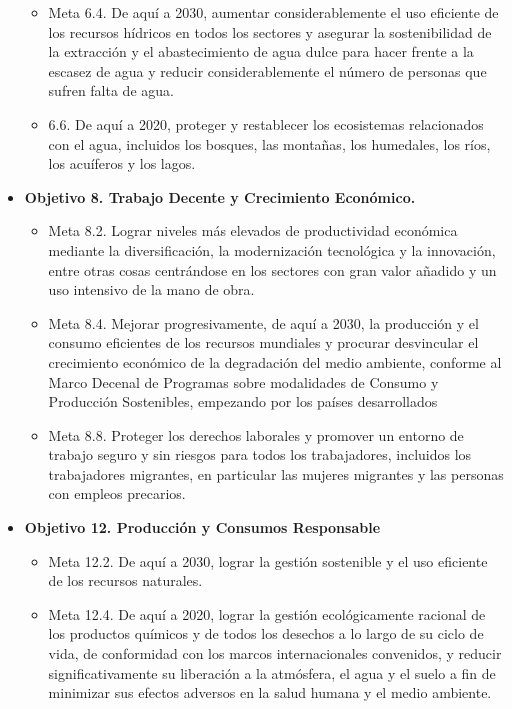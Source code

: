 \begin{itemize}
\begin{itemize}
        \item Meta 6.4. De aquí a 2030, aumentar considerablemente el uso eficiente de los recursos hídricos en todos los sectores y asegurar la sostenibilidad de la extracción y el abastecimiento de agua dulce para hacer frente a la escasez de agua y reducir considerablemente el número de personas que sufren falta de agua.
        \item 6.6. De aquí a 2020, proteger y restablecer los ecosistemas relacionados con el agua, incluidos los bosques, las montañas, los humedales, los ríos, los acuíferos y los lagos.
    \end{itemize}
    \item \textbf{Objetivo 8. Trabajo Decente y Crecimiento Económico.}
    \begin{itemize}
        \item Meta 8.2. Lograr niveles más elevados de productividad económica mediante la diversificación, la modernización tecnológica y la innovación, entre otras cosas centrándose en los sectores con gran valor añadido y un uso intensivo de la mano de obra.
        \item Meta 8.4. Mejorar progresivamente, de aquí a 2030, la producción y el consumo eficientes de los recursos mundiales y procurar desvincular el crecimiento económico de la degradación del medio ambiente, conforme al Marco Decenal de Programas sobre modalidades de Consumo y Producción Sostenibles, empezando por los países desarrollados
        \item Meta 8.8. Proteger los derechos laborales y promover un entorno de trabajo seguro y sin riesgos para todos los trabajadores, incluidos los trabajadores migrantes, en particular las mujeres migrantes y las personas con empleos precarios.
    \end{itemize}
    \item \textbf{Objetivo 12. Producción y Consumos Responsable}
    \begin{itemize}
        \item Meta 12.2. De aquí a 2030, lograr la gestión sostenible y el uso eficiente de los recursos naturales.
        \item Meta 12.4. De aquí a 2020, lograr la gestión ecológicamente racional de los productos químicos y de todos los desechos a lo largo de su ciclo de vida, de conformidad con los marcos internacionales convenidos, y reducir significativamente su liberación a la atmósfera, el agua y el suelo a fin de minimizar sus efectos adversos en la salud humana y el medio ambiente.
    \end{itemize}
\end{itemize}
